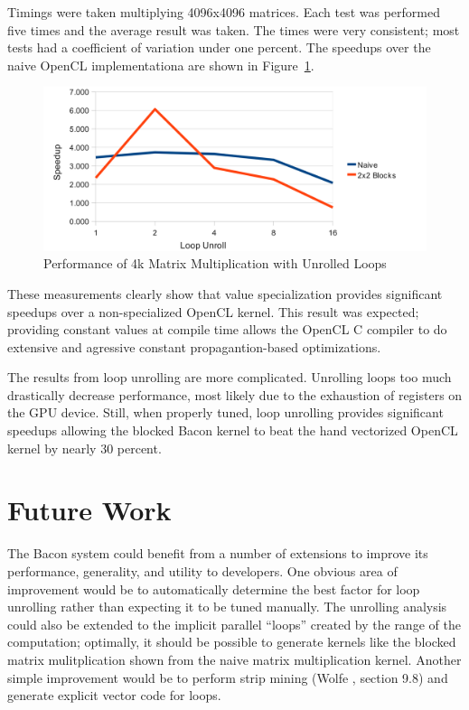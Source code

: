 \documentclass{llncs}
\begin{document}
Timings were taken multiplying 4096x4096 matrices. Each test was
performed five times and the average result was taken. The times were
very consistent; most tests had a coefficient of variation under one
percent. The speedups over the naive OpenCL implementationa are shown
in Figure~\ref{unroll}.

\begin{figure}[tbh]
\begin{center}
\includegraphics[clip]{unrolling}
\end{center}
\caption{Performance of 4k Matrix Multiplication with Unrolled Loops}\label{unroll}
\end{figure}

These measurements clearly show that value specialization provides
significant speedups over a non-specialized OpenCL kernel. This result
was expected; providing constant values at compile time allows the
OpenCL C compiler to do extensive and agressive constant
propagantion-based optimizations.

The results from loop unrolling are more complicated. Unrolling loops
too much drastically decrease performance, most likely due to the
exhaustion of registers on the GPU device. Still, when properly tuned,
loop unrolling provides significant speedups allowing the blocked
Bacon kernel to beat the hand vectorized OpenCL kernel by nearly 30
percent.

\section{Future Work}

The Bacon system could benefit from a number of extensions to improve
its performance, generality, and utility to developers. One obvious
area of improvement would be to automatically determine the best
factor for loop unrolling rather than expecting it to be tuned
manually. The unrolling analysis could also be extended to the
implicit parallel ``loops'' created by the range of the computation;
optimally, it should be possible to generate kernels like the blocked
matrix mulitplication shown from the naive matrix multiplication
kernel. Another simple improvement would be to perform strip mining
(Wolfe \cite{wolfe:1996}, section 9.8) and generate explicit vector
code for loops.
\end{document}
